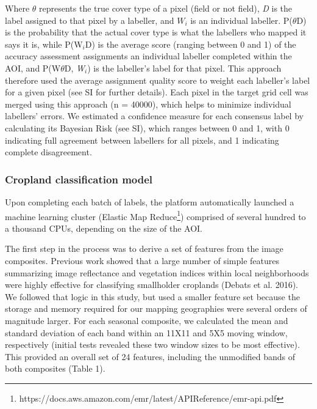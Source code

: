 \documentclass[11pt,a4paper]{article}
\begin{document}
Where \(\theta\) represents the true cover type of a pixel (field or not
field), \emph{D} is the label assigned to that pixel by a labeller, and
\(W_i\) is an individual labeller. P(\(\theta\)\textbar D) is the
probability that the actual cover type is what the labellers who mapped
it says it is, while P(W\(_i\)\textbar D) is the average score (ranging
between 0 and 1) of the accuracy assessment assignments an individual
labeller completed within the AOI, and P(W\(\theta\)\textbar D,
\emph{W}\(_i\)) is the labeller's label for that pixel. This approach
therefore used the average assignment quality score to weight each
labeller's label for a given pixel (see SI for further details). Each
pixel in the target grid cell was merged using this approach (n =
40000), which helps to minimize individual labellers' errors. We
estimated a confidence measure for each consensus label by calculating
its Bayesian Risk (see SI), which ranges between 0 and 1, with 0
indicating full agreement between labellers for all pixels, and 1
indicating complete disagreement.

\hypertarget{cropland-classification-model}{%
\subsubsection{Cropland classification
model}\label{cropland-classification-model}}

Upon completing each batch of labels, the platform automatically
launched a machine learning cluster (Elastic Map
Reduce\footnote{https://docs.aws.amazon.com/emr/latest/APIReference/emr-api.pdf})
comprised of several hundred to a thousand CPUs, depending on the size
of the AOI.

The first step in the process was to derive a set of features from the
image composites. Previous work showed that a large number of simple
features summarizing image reflectance and vegetation indices within
local neighborhoods were highly effective for classifying smallholder
croplands (Debats et al. 2016). We followed that logic in this study,
but used a smaller feature set because the storage and memory required
for our mapping geographies were several orders of magnitude larger. For
each seasonal composite, we calculated the mean and standard deviation
of each band within an 11X11 and 5X5 moving window, respectively
(initial tests revealed these two window sizes to be most effective).
This provided an overall set of 24 features, including the unmodified
bands of both composites (Table 1).
\end{document}
